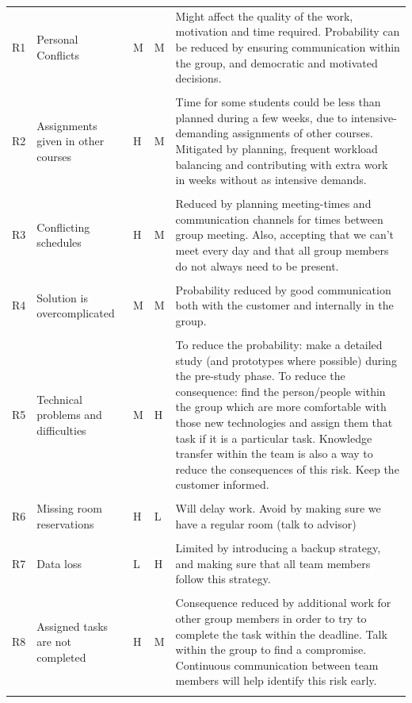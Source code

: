 \documentclass[11pt,a4paper,titlepage,oneside]{report}
\begin{document}
\begin{longtable}{p{0.7cm} p{2.5cm} p{0.7cm} p{0.7cm} p{6.5cm} }
  \hline
R1 & Personal Conflicts & \gls{M} & \gls{M} & Might affect the quality of the work, motivation and time required. Probability can be reduced by ensuring communication within the group, and democratic and motivated decisions. \\ \\ \hline
R2 & Assignments given in other courses & \gls{H} & \gls{M} & Time for some students could be less than planned during a few weeks, due to intensive-demanding assignments of other courses. Mitigated by planning, frequent workload balancing and contributing with extra work in weeks without as intensive demands. \\ \\ \hline
R3 & Conflicting schedules & \gls{H} & \gls{M} & Reduced by planning meeting-times and communication channels for times between group meeting. Also, accepting that we can't meet every day and that all group members do not always need to be present. \\ \\ \hline
R4 & Solution is overcomplicated & \gls{M} & \gls{M} & Probability reduced by good communication both with the customer and internally in the group. \\ \\ \hline
R5 & Technical problems and difficulties & \gls{M} & \gls{H} & To reduce the probability: make a detailed study (and \glspl{prototype} where possible) during the \gls{pre-study} phase. To reduce the consequence: find the person/people within the group which are more comfortable with those new technologies and assign them that task if it is a particular task. Knowledge transfer within the team is also a way to reduce the consequences of this risk. Keep the customer informed. \\ \\ \hline
R6 & Missing room reservations & \gls{H} & \gls{L} & Will delay work. Avoid by making sure we have a regular room (talk to advisor) \\ \\ \hline
R7 & Data loss & \gls{L} & \gls{H} & Limited by introducing a backup strategy, and making sure that all team members follow this strategy. \\ \\ \hline
R8 & Assigned tasks are not completed & \gls{H} & \gls{M} & Consequence reduced by additional work for other group members in order to try to complete the task within the deadline. Talk within the group to find a compromise. Continuous communication between team members will help identify this risk early.  \\ \\ \hline

\end{longtable}
\end{document}
